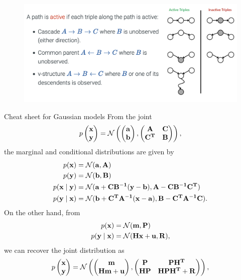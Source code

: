 \documentclass[11pt, a4paper]{article}
\begin{document}
\begin{figure}[h]
    \centering
    \includegraphics[width=.9\linewidth]{figures/triplets.png}
\end{figure}    

\newpage

\begin{thbox}{Cheat sheet for Gaussian models}
From the joint 
\[
p
\begin{pmatrix}
    \mathbf{x}\\
    \mathbf{y}
\end{pmatrix}
= \mathcal{N}
\begin{pmatrix}
    \begin{pmatrix}
        \mathbf{a}\\
        \mathbf{b}
    \end{pmatrix},
    \begin{pmatrix}
        \mathbf{A} & \mathbf{C}\\
        \mathbf{C^T} & \mathbf{B}
    \end{pmatrix}
\end{pmatrix},
\]
the marginal and conditional distributions are given by
\begin{align*}
    p(\mathbf{x}) &= \mathcal{N}(\mathbf{a}, \mathbf{A})\\
    p(\mathbf{y}) &= \mathcal{N}(\mathbf{b}, \mathbf{B})\\
    p(\mathbf{x \mid y}) &= \mathcal{N}(\mathbf{a + CB^{-1}(y - b)}, \mathbf{A - CB^{-1}C^T})\\
    p(\mathbf{y \mid x}) &= \mathcal{N}(\mathbf{b + C^T A^{-1}(x - a)}, \mathbf{B - C^T A^{-1}C}).
\end{align*}
On the other hand, from 
\begin{align*}
    p(\mathbf{x}) &= \mathcal{N}(\mathbf{m}, \mathbf{P})\\
    p(\mathbf{y \mid x}) &= \mathcal{N}(\mathbf{Hx + u}, \mathbf{R}),
\end{align*}
we can recover the joint distribution as
\[
p
\begin{pmatrix}
    \mathbf{x}\\
    \mathbf{y}
\end{pmatrix}
= \mathcal{N}
\begin{pmatrix}
    \begin{pmatrix}
        \mathbf{m}\\
        \mathbf{Hm + u}
    \end{pmatrix},
    \begin{pmatrix}
        \mathbf{P} & \mathbf{PH^T}\\
        \mathbf{HP} & \mathbf{HPH^T + R}
    \end{pmatrix}
\end{pmatrix},
\]
\end{thbox}
\end{document}
